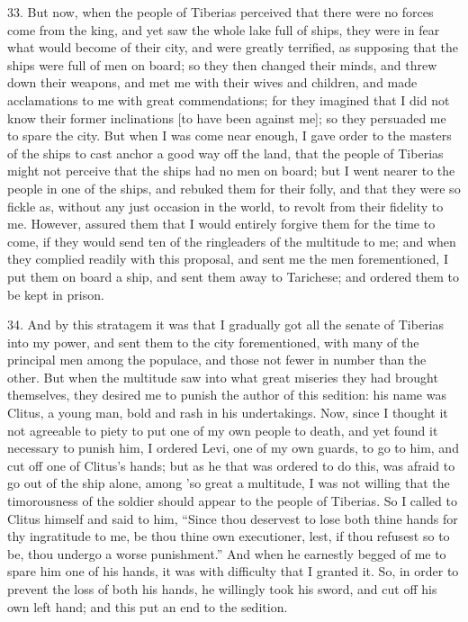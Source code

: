 33. But now, when the people of Tiberias perceived that there were no
forces come from the king, and yet saw the whole lake full of ships, they
were in fear what would become of their city, and were greatly terrified,
as supposing that the ships were full of men on board; so they then
changed their minds, and threw down their weapons, and met me with their
wives and children, and made acclamations to me with great commendations;
for they imagined that I did not know their former inclinations [to have
been against me]; so they persuaded me to spare the city. But when I was
come near enough, I gave order to the masters of the ships to cast anchor
a good way off the land, that the people of Tiberias might not perceive
that the ships had no men on board; but I went nearer to the people in one
of the ships, and rebuked them for their folly, and that they were so
fickle as, without any just occasion in the world, to revolt from their
fidelity to me. However, assured them that I would entirely forgive them
for the time to come, if they would send ten of the ringleaders of the
multitude to me; and when they complied readily with this proposal, and
sent me the men forementioned, I put them on board a ship, and sent them
away to Tarichese; and ordered them to be kept in prison.

34. And by this stratagem it was that I gradually got all the senate of
Tiberias into my power, and sent them to the city forementioned, with many
of the principal men among the populace, and those not fewer in number
than the other. But when the multitude saw into what great miseries they
had brought themselves, they desired me to punish the author of this
sedition: his name was Clitus, a young man, bold and rash in his
undertakings. Now, since I thought it not agreeable to piety to put one of
my own people to death, and yet found it necessary to punish him, I
ordered Levi, one of my own guards, to go to him, and cut off one of
Clitus's hands; but as he that was ordered to do this, was afraid to go
out of the ship alone, among 'so great a multitude, I was not willing that
the timorousness of the soldier should appear to the people of Tiberias.
So I called to Clitus himself and said to him, ``Since thou deservest to
lose both thine hands for thy ingratitude to me, be thou thine own
executioner, lest, if thou refusest so to be, thou undergo a worse
punishment.'' And when he earnestly begged of me to spare him one of his
hands, it was with difficulty that I granted it. So, in order to prevent
the loss of both his hands, he willingly took his sword, and cut off his
own left hand; and this put an end to the sedition.


